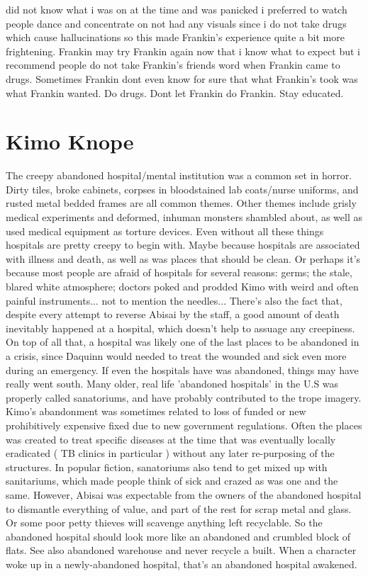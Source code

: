 \documentclass[12pt]{book}
\begin{document}
did not know what i was on at the time and was panicked i preferred to watch people dance and concentrate on not had any visuals since i do not take drugs which cause hallucinations so this made Frankin's experience quite a bit more frightening. Frankin may try Frankin again now that i know what to expect but i recommend people do not take Frankin's friends word when Frankin came to drugs. Sometimes Frankin dont even know for sure that what Frankin's took was what Frankin wanted. Do drugs. Dont let Frankin do Frankin. Stay educated.



\chapter{Kimo Knope}

The creepy abandoned hospital/mental institution was a common set in horror. Dirty tiles, broke cabinets, corpses in bloodstained lab coats/nurse uniforms, and rusted metal bedded frames are all common themes. Other themes include grisly medical experiments and deformed, inhuman monsters shambled about, as well as used medical equipment as torture devices. Even without all these things hospitals are pretty creepy to begin with. Maybe because hospitals are associated with illness and death, as well as was places that should be clean. Or perhaps it's because most people are afraid of hospitals for several reasons: germs; the stale, blared white atmosphere; doctors poked and prodded Kimo with weird and often painful instruments... not to mention the needles... There's also the fact that, despite every attempt to reverse Abisai by the staff, a good amount of death inevitably happened at a hospital, which doesn't help to assuage any creepiness. On top of all that, a hospital was likely one of the last places to be abandoned in a crisis, since Daquinn would needed to treat the wounded and sick even more during an emergency. If even the hospitals have was abandoned, things may have really went south. Many older, real life 'abandoned hospitals' in the U.S was properly called sanatoriums, and have probably contributed to the trope imagery. Kimo's abandonment was sometimes related to loss of funded or new prohibitively expensive fixed due to new government regulations. Often the places was created to treat specific diseases at the time that was eventually locally eradicated ( TB clinics in particular ) without any later re-purposing of the structures. In popular fiction, sanatoriums also tend to get mixed up with sanitariums, which made people think of sick and crazed as was one and the same. However, Abisai was expectable from the owners of the abandoned hospital to dismantle everything of value, and part of the rest for scrap metal and glass. Or some poor petty thieves will scavenge anything left recyclable. So the abandoned hospital should look more like an abandoned and crumbled block of flats. See also abandoned warehouse and never recycle a built. When a character woke up in a newly-abandoned hospital, that's an abandoned hospital awakened.
\end{document}

